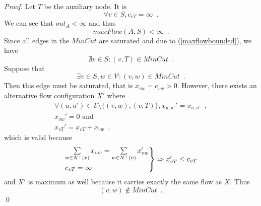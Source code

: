 \documentclass[11pt]{llncs}
\begin{document}
    \begin{proof}
       Let $T$ be the auxiliary node. It is
       \begin{equation}
          \forall v \in S, c_{vT} = \infty \enspace.
       \end{equation}
       We can see that $out_A < \infty$ and thus
       \begin{equation}
       \label{maxflowbounded}
          maxFlow\left(A, S\right) < \infty \enspace.
       \end{equation}
       Since all edges in the $MinCut$ are saturated and due to (\ref{maxflowbounded}), we have
       \begin{equation}
          \nexists v \in S : \left(v, T\right) \in MinCut \enspace.
       \end{equation}
       Suppose that
       \begin{equation}
          \exists v \in S, w \in \mathcal{V} : \left(v, w\right) \in MinCut \enspace.
       \end{equation}
       Then this edge must be saturated, that is $x_{vw} = c_{vw} > 0$. However, there exists an alternative flow
       configuration $X'$ where
       \begin{equation}
       \begin{gathered}
          \forall \left(u, u'\right) \in \mathcal{E} \setminus \{\left(v, w\right), \left(v, T\right)\}, x_{u,u'}' =
          x_{u,u'} \enspace, \\
          x_{vw}' = 0 \mbox{ and} \\
          x_{vT}' = x_{vT} + x_{vw} \enspace,
       \end{gathered}
       \end{equation}
       which is valid because
       \begin{equation}
          \begin{rcases}
             \sum\limits_{w \in N^{+}\left(v\right)}x_{vw} = \sum\limits_{w \in N^{+}\left(v\right)}x_{vw}' \\
             c_{vT} = \infty
          \end{rcases}
          \Rightarrow x_{vT}' \leq c_{vT}
       \end{equation}
       and $X'$ is maximum as well because it carries exactly the same flow as $X$. Thus
       \begin{equation}
          \left(v, w\right) \notin MinCut \enspace.
       \end{equation}
       \qed
    \end{proof}
\end{document}
